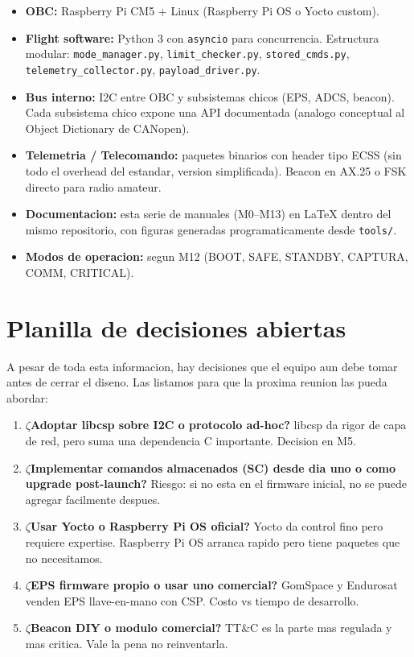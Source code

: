 \documentclass[11pt,a4paper,oneside,openright]{book}
\begin{document}
\begin{tecnico}
\begin{itemize}[leftmargin=2em]
  \item \textbf{OBC:} Raspberry Pi CM5 + Linux (Raspberry Pi OS o
    Yocto custom).
  \item \textbf{Flight software:} Python 3 con \texttt{asyncio} para
    concurrencia. Estructura modular: \texttt{mode\_manager.py},
    \texttt{limit\_checker.py}, \texttt{stored\_cmds.py},
    \texttt{telemetry\_collector.py}, \texttt{payload\_driver.py}.
  \item \textbf{Bus interno:} I2C entre OBC y subsistemas chicos
    (EPS, ADCS, beacon). Cada subsistema chico expone una API
    documentada (analogo conceptual al Object Dictionary de
    CANopen).
  \item \textbf{Telemetria / Telecomando:} paquetes binarios con
    header tipo ECSS (sin todo el overhead del estandar, version
    simplificada). Beacon en AX.25 o FSK directo para radio
    amateur.
  \item \textbf{Documentacion:} esta serie de manuales (M0--M13) en
    LaTeX dentro del mismo repositorio, con figuras generadas
    programaticamente desde \texttt{tools/}.
  \item \textbf{Modos de operacion:} segun M12 (BOOT, SAFE, STANDBY,
    CAPTURA, COMM, CRITICAL).
\end{itemize}
\end{tecnico}

\section{Planilla de decisiones abiertas}

A pesar de toda esta informacion, hay decisiones que el equipo aun
debe tomar antes de cerrar el diseno. Las listamos para que la
proxima reunion las pueda abordar:

\begin{enumerate}[leftmargin=2em]
  \item \textbf{$\zeta$Adoptar libcsp sobre I2C o protocolo ad-hoc?}
    libcsp da rigor de capa de red, pero suma una dependencia C
    importante. Decision en M5.
  \item \textbf{$\zeta$Implementar comandos almacenados (SC)
    desde dia uno o como upgrade post-launch?} Riesgo: si no esta en
    el firmware inicial, no se puede agregar facilmente despues.
  \item \textbf{$\zeta$Usar Yocto o Raspberry Pi OS oficial?} Yocto
    da control fino pero requiere expertise. Raspberry Pi OS arranca
    rapido pero tiene paquetes que no necesitamos.
  \item \textbf{$\zeta$EPS firmware propio o usar uno comercial?}
    GomSpace y Endurosat venden EPS llave-en-mano con CSP. Costo
    vs tiempo de desarrollo.
  \item \textbf{$\zeta$Beacon DIY o modulo comercial?} TT\&C es la
    parte mas regulada y mas critica. Vale la pena no reinventarla.
\end{enumerate}
\end{document}
